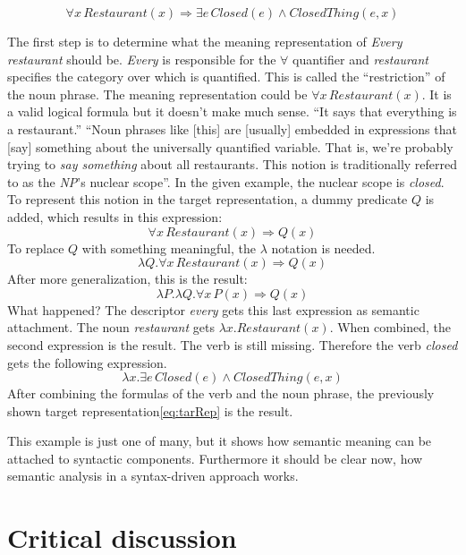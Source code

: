 \documentclass[12pt,twoside]{scrartcl}
\theoremstyle{plain}
\theoremstyle{definition}
\theoremstyle{remark}
\begin{document}
		\begin{equation}
		\label{eq:tarRep}
			\forall x \,Restaurant(x) \Rightarrow \exists e \,Closed(e) \wedge ClosedThing(e,x)
		\end{equation}
		
		The first step is to determine what the meaning representation of \textit{Every restaurant} should be. \textit{Every} is responsible for the $\forall$ quantifier and \textit{restaurant} specifies the category over which is quantified. This is called the ``restriction''\cite[p.~622]{Jurafsky2009} of the noun phrase. The meaning representation could be $\forall x\,Restaurant(x)$. It is a valid logical formula but it doesn't make much sense. ``It says that everything is a restaurant.''\cite[p.~622]{Jurafsky2009} ``Noun phrases like [this] are [usually] embedded in expressions that [say] something about the universally quantified variable. That is, we're probably trying to \textit{say something} about all restaurants. This notion is traditionally referred to as the \textit{NP}'s nuclear scope''\cite[p.~622]{Jurafsky2009}. In the given example, the nuclear scope is \textit{closed}. To represent this notion in the target representation, a dummy predicate $Q$ is added, which results in this expression:
		\[
			\forall x\,Restaurant(x) \Rightarrow Q(x)
		\]
		To replace $Q$ with something meaningful, the $\lambda$ notation is needed.
		\[
			\lambda Q.\forall x\,Restaurant(x) \Rightarrow Q(x)
		\] 
		After more generalization, this is the result:
		\[
			\lambda P.\lambda Q.\forall x\,P(x) \Rightarrow Q(x)
		\]
		What happened? The descriptor \textit{every} gets this last expression as semantic attachment. The noun \textit{restaurant} gets $\lambda x.Restaurant(x)$. When combined, the second expression is the result. The verb is still missing. Therefore the verb \textit{closed} gets the following expression.
		\[
			\lambda x.\exists e\,Closed(e) \wedge ClosedThing(e,x)
		\]
		After combining the formulas of the verb and the noun phrase, the previously shown target representation\eqref{eq:tarRep} is the result.
		
		This example is just one of many, but it shows how semantic meaning can be attached to syntactic components. Furthermore it should be clear now, how semantic analysis in a syntax-driven approach works.
\section{Critical discussion}
\label{sec:critDiscussion}
\end{document}

